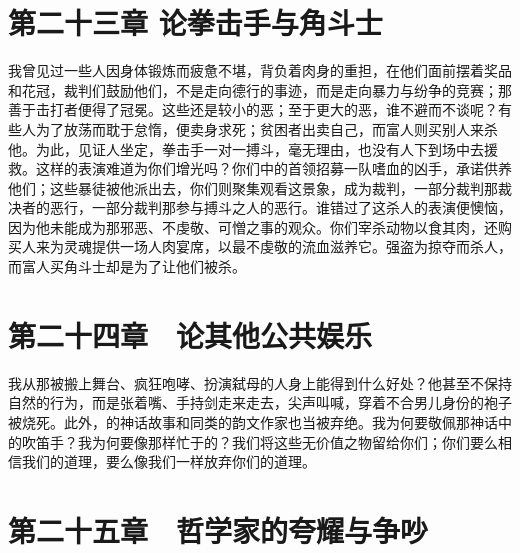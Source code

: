 
\section{第二十三章 论拳击手与角斗士}

我曾见过一些人因身体锻炼而疲惫不堪，背负着肉身的重担，在他们面前摆着奖品和花冠，裁判们鼓励他们，不是走向德行的事迹，而是走向暴力与纷争的竞赛；那善于击打者便得了冠冕。这些还是较小的恶；至于更大的恶，谁不避而不谈呢？有些人为了放荡而耽于怠惰，便卖身求死；贫困者出卖自己，而富人则买别人来杀他。为此，见证人坐定，拳击手一对一搏斗，毫无理由，也没有人下到场中去援救。这样的表演难道为你们增光吗？你们中的首领招募一队嗜血的凶手，承诺供养他们；这些暴徒被他派出去，你们则聚集观看这景象，成为裁判，一部分裁判那裁决者的恶行，一部分裁判那参与搏斗之人的恶行。谁错过了这杀人的表演便懊恼，因为他未能成为那邪恶、不虔敬、可憎之事的观众。你们宰杀动物以食其肉，还购买人来为灵魂提供一场人肉宴席，以最不虔敬的流血滋养它。强盗为掠夺而杀人，而富人买角斗士却是为了让他们被杀。\par


\section{第二十四章　论其他公共娱乐}

我从那被搬上舞台、疯狂咆哮、扮演弑母的人身上能得到什么好处？他甚至不保持自然的行为，而是张着嘴、手持剑走来走去，尖声叫喊，穿着不合男儿身份的袍子被烧死。此外，的神话故事和同类的韵文作家也当被弃绝。我为何要敬佩那神话中的吹笛手？我为何要像那样忙于的？我们将这些无价值之物留给你们；你们要么相信我们的道理，要么像我们一样放弃你们的道理。\par


\section{第二十五章　哲学家的夸耀与争吵}

